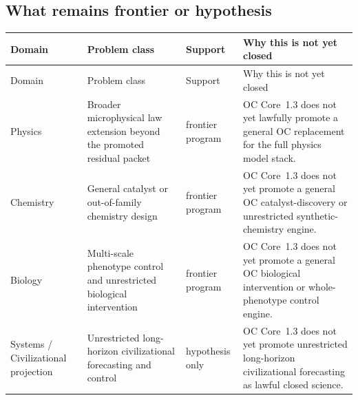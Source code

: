 \subsection{What remains frontier or hypothesis}
\begingroup
\scriptsize
\setlength{\emergencystretch}{1.5em}
\setlength{\tabcolsep}{2pt}
\setlength{\LTleft}{0pt}
\setlength{\LTright}{0pt}
\begin{longtable}{@{}L{0.11\textwidth}L{0.19\textwidth}L{0.14\textwidth}L{0.48\textwidth}@{}}
\toprule
Domain & Problem class & Support & Why this is not yet closed \\
\midrule
\endfirsthead
\toprule
Domain & Problem class & Support & Why this is not yet closed \\
\midrule
\endhead
Physics & Broader microphysical law extension beyond the promoted residual packet & frontier program & OC Core~1.3 does not yet lawfully promote a general OC replacement for the full physics model stack. \\
Chemistry & General catalyst or out-of-family chemistry design & frontier program & OC Core~1.3 does not yet promote a general OC catalyst-discovery or unrestricted synthetic-chemistry engine. \\
Biology & Multi-scale phenotype control and unrestricted biological intervention & frontier program & OC Core~1.3 does not yet promote a general OC biological intervention or whole-phenotype control engine. \\
Systems / Civilizational projection & Unrestricted long-horizon civilizational forecasting and control & hypothesis only & OC Core~1.3 does not yet promote unrestricted long-horizon civilizational forecasting as lawful closed science. \\
\bottomrule
\end{longtable}
\endgroup

